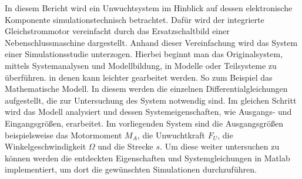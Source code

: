 
\label{Einleitung}
In diesem Bericht wird ein Unwuchtsystem im Hinblick auf dessen elektronische Komponente simulationstechnisch betrachtet. Dafür wird der integrierte Gleichstrommotor vereinfacht durch das Ersatzschaltbild einer Nebenschlussmaschine dargestellt. Anhand dieser Vereinfachung wird das System einer Simulationsstudie unterzogen. Hierbei beginnt man das Originalsystem, mittels Systemanalysen und Modellbildung, in Modelle oder Teilsysteme zu überführen. in denen kann leichter gearbeitet werden. So zum Beispiel das Mathematische Modell. In diesem werden die einzelnen Differentialgleichungen aufgestellt, die zur Untersuchung des System notwendig sind. Im gleichen Schritt wird das Modell analysiert und dessen Systemeigenschaften, wie Ausgangs- und Eingangsgrößen, erarbeitet. Im vorliegenden System sind die Ausgangsgrößen beispielsweise das Motormoment $M_A$, die Unwuchtkraft $F_U$, die Winkelgeschwindigkeit $\Omega$ und die Strecke $s$. Um diese weiter untersuchen zu können werden die entdeckten Eigenschaften und Systemgleichungen in Matlab implementiert, um dort die gewünschten Simulationen durchzuführen. 
